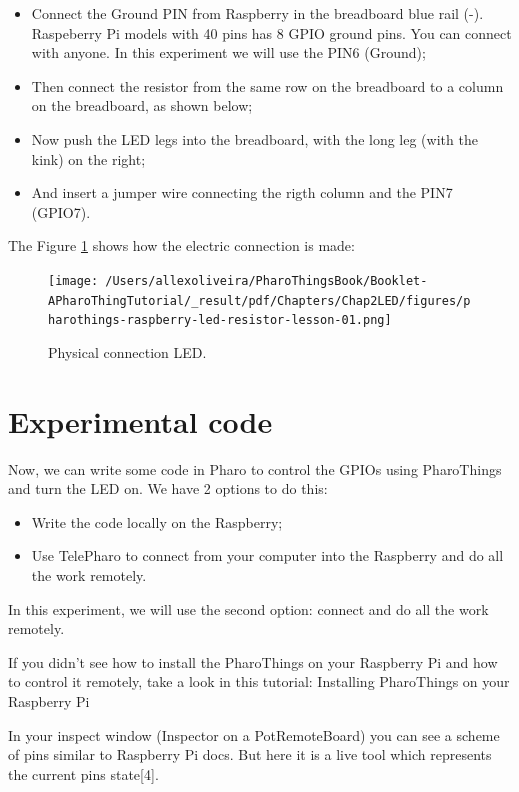 \documentclass[10pt,twoside,english]{_support/latex/sbabook/sbabook}
\begin{document}
\begin{itemize}
\item Connect the Ground PIN from Raspberry in the breadboard blue rail (-). Raspeberry Pi models with 40 pins has 8 GPIO ground pins. You can connect with anyone. In this experiment we will use the PIN6 (Ground);
\item Then connect the resistor from the same row on the breadboard to a column on the breadboard, as shown below;
\item Now push the LED legs into the breadboard, with the long leg (with the kink) on the right;
\item And insert a jumper wire connecting the rigth column and the PIN7 (GPIO7).
\end{itemize}

The Figure \ref{physicalLed} shows how the electric connection is made:


\begin{figure}

\begin{center}
\texttt{[image: /Users/allexoliveira/PharoThingsBook/Booklet-APharoThingTutorial/\_result/pdf/Chapters/Chap2LED/figures/pharothings-raspberry-led-resistor-lesson-01.png]}\caption{Physical connection LED.\label{physicalLed}}\end{center}
\end{figure}

\section{Experimental code}
Now, we can write some code in Pharo to control the GPIOs using PharoThings and turn the LED on. We have 2 options to do this:

\begin{itemize}
\item Write the code locally on the Raspberry;
\item Use TelePharo to connect from your computer into the Raspberry and do all the work remotely.
\end{itemize}

In this experiment, we will use the second option: connect and do all the work remotely. 

If you didn’t see how to install the PharoThings on your Raspberry Pi and how to control it remotely, take a look in this tutorial: Installing PharoThings on your Raspberry Pi

In your inspect window (Inspector on a PotRemoteBoard) you can see a scheme of pins similar to Raspberry Pi docs. But here it is a live tool which represents the current pins state{[}4{]}.
\end{document}
